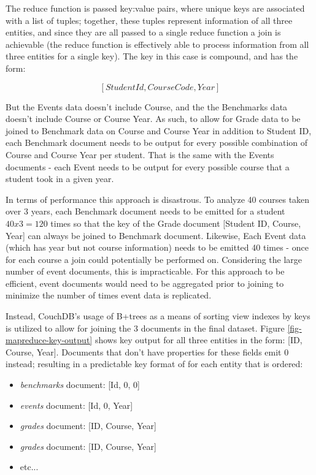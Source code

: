 The reduce function is passed key:value pairs, where unique keys are associated with a list of tuples; together, these tuples represent information of all three entities, and since they are all passed to a single reduce function a join is achievable (the reduce function is effectively able to process information from all three entities for a single key). The key in this case is compound, and has the form:

\[[StudentId,CourseCode,Year]\]

But the Events data doesn't include Course, and the the Benchmarks data doesn't include Course or Course Year. As such, to allow for Grade data to be joined to Benchmark data on Course and Course Year in addition to Student ID, each Benchmark document needs to be output for every possible combination of Course and Course Year per student. That is the same with the Events documents - each Event needs to be output for every possible course that a student took in a given year.

In terms of performance this approach is disastrous. To analyze 40 courses taken over 3 years, each Benchmark document needs to be emitted for a student $40 x 3 = 120$ times so that the key of the Grade document [Student ID, Course, Year] can always be joined to Benchmark document. Likewise, Each Event data (which has year but not course information) needs to be emitted 40 times - once for each course a join could potentially be performed on. Considering the large number of event documents, this is impracticable. For this approach to be efficient, event documents would need to be aggregated prior to joining to minimize the number of times event data is replicated.

Instead, CouchDB's usage of B+trees as a means of sorting view indexes by keys is utilized to allow for joining the 3 documents in the final dataset. Figure \ref{fig-mapreduce-key-output} shows key output for all three entities in the form: [ID, Course, Year]. Documents that don't have properties for these fields emit 0 instead; resulting in a predictable key format of for each entity that is ordered:

\begin{itemize}
    \item \textit{benchmarks} document: [Id, 0, 0]
    \item \textit{events} document: [Id, 0, Year]
    \item \textit{grades} document: [ID, Course, Year]
    \item \textit{grades} document: [ID, Course, Year]
    \item etc...
\end{itemize}

